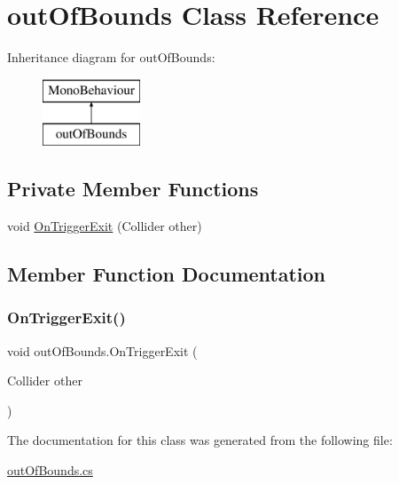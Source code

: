\hypertarget{classout_of_bounds}{}\section{out\+Of\+Bounds Class Reference}
\label{classout_of_bounds}
Inheritance diagram for out\+Of\+Bounds\+:\begin{figure}[H]
\begin{center}
\leavevmode
\includegraphics[height=2.000000cm]{classout_of_bounds}
\end{center}
\end{figure}
\subsection*{Private Member Functions}
\begin{DoxyCompactItemize}
\item 
void \mbox{\hyperlink{classout_of_bounds_ae4f37639924e582f648b5caa8d8cc448}{On\+Trigger\+Exit}} (Collider other)
\end{DoxyCompactItemize}


\subsection{Member Function Documentation}
\mbox{\label{classout_of_bounds_ae4f37639924e582f648b5caa8d8cc448}} 
\subsubsection{\texorpdfstring{On\+Trigger\+Exit()}{OnTriggerExit()}}
{\footnotesize\ttfamily void out\+Of\+Bounds.\+On\+Trigger\+Exit (\begin{DoxyParamCaption}\item[{Collider}]{other }\end{DoxyParamCaption})\hspace{0.3cm}{\ttfamily [private]}}



The documentation for this class was generated from the following file\+:\begin{DoxyCompactItemize}
\item 
\mbox{\hyperlink{out_of_bounds_8cs}{out\+Of\+Bounds.\+cs}}\end{DoxyCompactItemize}
